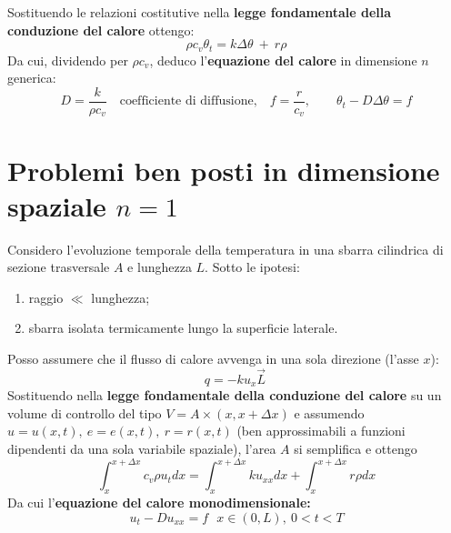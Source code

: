 \documentclass[10pt,a4paper,twoside,openright]{book}
\begin{document}
Sostituendo le relazioni costitutive nella \textbf{legge fondamentale della conduzione del calore} ottengo:
\begin{equation*}
\boxed{\rho c_{v} \theta _{t} =k\Delta \theta \ +\ r\rho }
\end{equation*}
Da cui, dividendo per $\displaystyle \rho c_{v}$, deduco l'\textbf{equazione del calore} in dimensione $n$ generica:
\begin{equation*}
D=\frac{k}{\rho c_{v}} \quad \text{coefficiente di diffusione,} \quad f=\frac{r}{c_{v}}, \qquad \boxed{\theta _{t} -D\Delta \theta =f}
\end{equation*}

\section{Problemi ben posti in dimensione spaziale \texorpdfstring{$n=1$}{n=1}}

Considero l'evoluzione temporale della temperatura in una sbarra cilindrica di sezione trasversale $\displaystyle A$ e lunghezza $\displaystyle L$. Sotto le ipotesi:
\begin{enumerate}
\item  raggio $\ll$ lunghezza;
\item  sbarra isolata termicamente lungo la superficie laterale.
\end{enumerate}

Posso assumere che il flusso di calore avvenga in una sola direzione (l'asse $\displaystyle x$):
\begin{equation*}
q=-ku_{x}\vec{L} \ 
\end{equation*}
Sostituendo nella \textbf{legge fondamentale della conduzione del calore} su un volume di controllo del tipo $\displaystyle V=A\times (x,x+\Delta x)$ e assumendo $\displaystyle u=u(x,t),\ e=e(x,t),\ r=r(x,t)$ (ben approssimabili a funzioni dipendenti da una sola variabile spaziale), l'area $\displaystyle A$ si semplifica e ottengo
\begin{equation*}
\int ^{x+\Delta x}_{x} c_{v} \rho u_{t} dx=\int ^{x+\Delta x}_{x} ku_{xx} dx+\int ^{x+\Delta x}_{x} r\rho dx
\end{equation*}
Da cui l'\textbf{equazione del calore monodimensionale:}
\begin{equation*}
\boxed{u_{t} -Du_{xx} =f} \ \ \ x\in (0,L),\ 0< t< T
\end{equation*}
\end{document}
